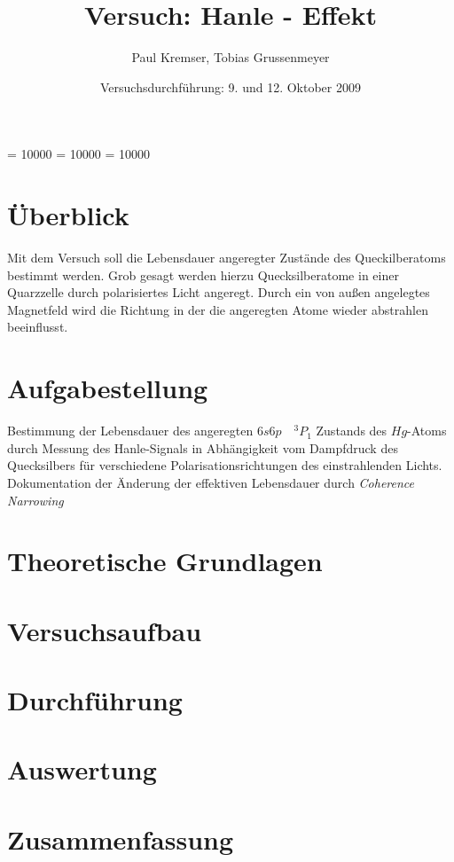 \documentclass[12pt]{article}
\newcommand{\changefont}[3]{
\fontfamily{#1} \fontseries{#2} \fontshape{#3} \selectfont}
\begin{document}
\clubpenalty = 10000
\widowpenalty = 10000 
\displaywidowpenalty = 10000

\onehalfspacing
\changefont{ptm}{m}{n} 

\begin{titlepage}
\author{Paul Kremser, Tobias Grussenmeyer}
\title{Versuch: Hanle - Effekt}
\date{Versuchsdurchführung: 9. und 12. Oktober 2009} 
\maketitle
\thispagestyle{empty}
\end{titlepage}


\tableofcontents
\thispagestyle{empty}
\newpage
{}
\section{Überblick}
Mit dem Versuch soll die Lebensdauer angeregter Zustände des Queckilberatoms bestimmt werden. Grob gesagt werden hierzu Quecksilberatome in einer 
Quarzzelle durch polarisiertes Licht angeregt. Durch ein von außen angelegtes Magnetfeld wird die Richtung
in der die angeregten Atome wieder abstrahlen beeinflusst.

\section{Aufgabestellung}
Bestimmung der Lebensdauer des angeregten $6s6p \quad ^3P_1$ Zustands des $Hg$-Atoms durch Messung des Hanle-Signals in Abhängigkeit vom Dampfdruck
des Quecksilbers für verschiedene Polarisationsrichtungen des einstrahlenden Lichts. Dokumentation der Änderung der effektiven Lebensdauer durch
\textit{Coherence Narrowing}

\section{Theoretische Grundlagen}

\section{Versuchsaufbau}

\section{Durchführung}

\section{Auswertung}

\section{Zusammenfassung}
\end{document}
